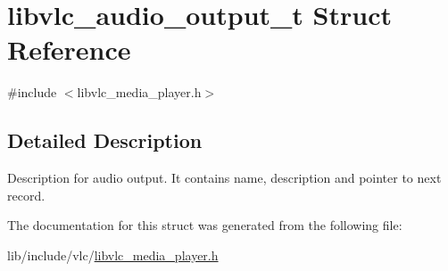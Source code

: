 \hypertarget{structlibvlc__audio__output__t}{}\section{libvlc\+\_\+audio\+\_\+output\+\_\+t Struct Reference}
\label{structlibvlc__audio__output__t}


{\ttfamily \#include $<$libvlc\+\_\+media\+\_\+player.\+h$>$}



\subsection{Detailed Description}
Description for audio output. It contains name, description and pointer to next record. 

The documentation for this struct was generated from the following file\+:\begin{DoxyCompactItemize}
\item 
lib/include/vlc/\hyperlink{libvlc__media__player_8h}{libvlc\+\_\+media\+\_\+player.\+h}\end{DoxyCompactItemize}

